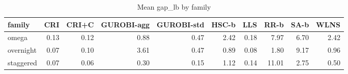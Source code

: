 \begin{table}[htbp]
\centering
\small
\caption{Mean gap\_lb by family}
\label{tab:E4b_equal_budgets_60s_b60_by_family}
\begin{tabular}{lrrrrrrrrr}
\toprule
family & CRI & CRI+C & GUROBI-agg & GUROBI-std & HSC-b & LLS & RR-b & SA-b & WLNS \\
\midrule
omega & 0.13 & 0.12 & 0.88 & 0.47 & 2.42 & 0.18 & 7.97 & 6.70 & 2.42 \\
overnight & 0.07 & 0.10 & 3.61 & 0.47 & 0.89 & 0.08 & 1.80 & 9.17 & 0.96 \\
staggered & 0.07 & 0.06 & 0.30 & 0.15 & 1.12 & 0.14 & 11.01 & 2.75 & 0.50 \\
\bottomrule
\end{tabular}
\end{table}
